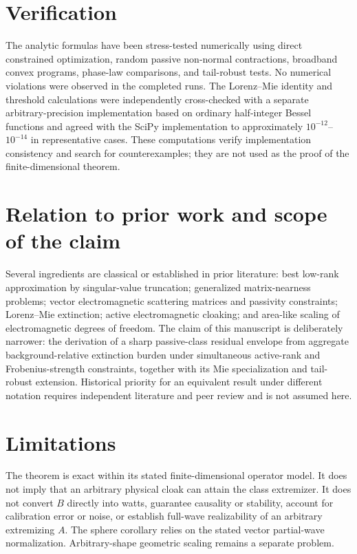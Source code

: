\documentclass[aps,pra,onecolumn,superscriptaddress,nofootinbib]{revtex4-2}
\begin{document}
\section{Verification}
The analytic formulas have been stress-tested numerically using direct constrained optimization, random passive non-normal contractions, broadband convex programs, phase-law comparisons, and tail-robust tests. No numerical violations were observed in the completed runs. The Lorenz--Mie identity and threshold calculations were independently cross-checked with a separate arbitrary-precision implementation based on ordinary half-integer Bessel functions and agreed with the SciPy implementation to approximately $10^{-12}$--$10^{-14}$ in representative cases. These computations verify implementation consistency and search for counterexamples; they are not used as the proof of the finite-dimensional theorem.

\section{Relation to prior work and scope of the claim}
Several ingredients are classical or established in prior literature: best low-rank approximation by singular-value truncation; generalized matrix-nearness problems; vector electromagnetic scattering matrices and passivity constraints; Lorenz--Mie extinction; active electromagnetic cloaking; and area-like scaling of electromagnetic degrees of freedom. The claim of this manuscript is deliberately narrower: the derivation of a sharp passive-class residual envelope from aggregate background-relative extinction burden under simultaneous active-rank and Frobenius-strength constraints, together with its Mie specialization and tail-robust extension. Historical priority for an equivalent result under different notation requires independent literature and peer review and is not assumed here.

\section{Limitations}
The theorem is exact within its stated finite-dimensional operator model. It does not imply that an arbitrary physical cloak can attain the class extremizer. It does not convert $B$ directly into watts, guarantee causality or stability, account for calibration error or noise, or establish full-wave realizability of an arbitrary extremizing $A$. The sphere corollary relies on the stated vector partial-wave normalization. Arbitrary-shape geometric scaling remains a separate problem.
\end{document}
